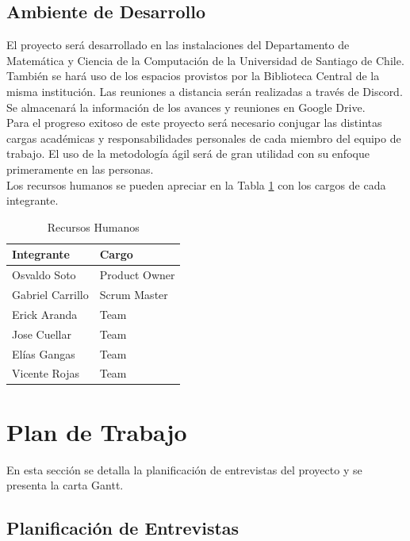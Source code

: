 \documentclass[letterpaper, 10pt]{article}
\begin{document}
\subsection{Ambiente de Desarrollo}
El proyecto será desarrollado en las instalaciones del Departamento de Matemática y Ciencia de la Computación de la Universidad de Santiago de Chile. También se hará uso de los espacios provistos por la Biblioteca Central de la misma institución.
Las reuniones a distancia serán realizadas a través de Discord. Se almacenará la información de los avances y reuniones en Google Drive.\\
Para el progreso exitoso de este proyecto será necesario conjugar las distintas cargas académicas y responsabilidades personales de cada miembro del equipo de trabajo. El uso de la metodología ágil será de gran utilidad con su enfoque primeramente en las personas.\\
Los recursos humanos se pueden apreciar en la Tabla \ref{table:3} con los cargos de cada integrante.
\begin{table}[H]
    \centering
    \caption{Recursos Humanos}
	\vspace{0.2cm}
    \begin{tabular}{|l|l|} \hline
        \textbf{Integrante} & \textbf{Cargo}\\ \hline
		Osvaldo Soto & Product Owner\\\hline
		Gabriel Carrillo & Scrum Master\\\hline
		Erick Aranda & Team\\\hline
		Jose Cuellar & Team\\\hline
         Elías Gangas & Team\\\hline
         Vicente Rojas & Team\\\hline
    \end{tabular}
    
    \label{table:3}
\end{table}

\section{Plan de Trabajo}
En esta sección se detalla la planificación de entrevistas del proyecto y se presenta la carta Gantt.
\subsection{Planificación de Entrevistas}
\end{document}
